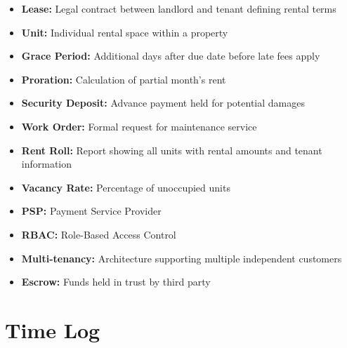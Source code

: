 \documentclass[12pt]{article}
\begin{document}
\begin{itemize}
    \item \textbf{Lease:} Legal contract between landlord and tenant defining rental terms
    \item \textbf{Unit:} Individual rental space within a property
    \item \textbf{Grace Period:} Additional days after due date before late fees apply
    \item \textbf{Proration:} Calculation of partial month's rent
    \item \textbf{Security Deposit:} Advance payment held for potential damages
    \item \textbf{Work Order:} Formal request for maintenance service
    \item \textbf{Rent Roll:} Report showing all units with rental amounts and tenant information
    \item \textbf{Vacancy Rate:} Percentage of unoccupied units
    \item \textbf{PSP:} Payment Service Provider
    \item \textbf{RBAC:} Role-Based Access Control
    \item \textbf{Multi-tenancy:} Architecture supporting multiple independent customers
    \item \textbf{Escrow:} Funds held in trust by third party
\end{itemize}


\appendix

\section{Time Log}
\end{document}
